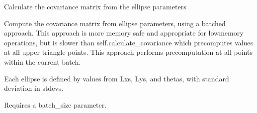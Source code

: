 \documentclass[letterpaper,10pt,english]{sphinxmanual}
\begin{document}
\begin{fulllineitems}
\begin{fulllineitems}
\begin{quote}
\begin{description}
\end{description}\end{quote}

\end{fulllineitems}


\begin{fulllineitems}
\label{\detokenize{ellipse:glomar_gridding.ellipse.EllipseCovarianceBuilder.calculate_covariance_array}}
\pysigstartsignatures
\pysiglinewithargsret
{}
{}
{}
\pysigstopsignatures
\sphinxAtStartPar
Calculate the covariance matrix from the ellipse parameters
\begin{quote}\begin{description}
\sphinxAtStartPar
{}

\end{description}\end{quote}

\end{fulllineitems}


\begin{fulllineitems}
\label{\detokenize{ellipse:glomar_gridding.ellipse.EllipseCovarianceBuilder.calculate_covariance_batched}}
\pysigstartsignatures
\pysiglinewithargsret
{}
{}
{}
\pysigstopsignatures
\sphinxAtStartPar
Compute the covariance matrix from ellipse parameters, using a batched
approach.
This approach is more memory safe and appropriate for low\sphinxhyphen{}memory
operations, but is slower than self.calculate\_covariance
which pre\sphinxhyphen{}computes values at all upper triangle points. This approach
performs pre\sphinxhyphen{}computation at all points within the current batch.

\sphinxAtStartPar
Each ellipse is defined by values from Lxs, Lys, and thetas, with
standard deviation in stdevs.

\sphinxAtStartPar
Requires a batch\_size parameter.
\begin{quote}\begin{description}
\sphinxAtStartPar
{}


\end{description}
\end{quote}
\end{fulllineitems}
\end{fulllineitems}
\end{document}
